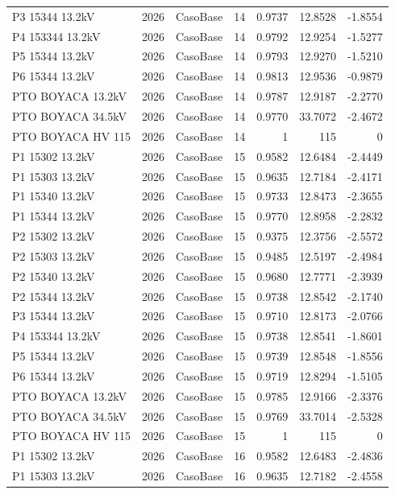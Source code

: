 \documentclass[11pt,a4paper]{article}
\begin{document}
\begin{longtable}{llllrrr}
P3 15344 13.2kV & 2026 & CasoBase & 14 & 0.9737 & 12.8528 & -1.8554 \\
P4 153344 13.2kV & 2026 & CasoBase & 14 & 0.9792 & 12.9254 & -1.5277 \\
P5 15344 13.2kV & 2026 & CasoBase & 14 & 0.9793 & 12.9270 & -1.5210 \\
P6 15344 13.2kV & 2026 & CasoBase & 14 & 0.9813 & 12.9536 & -0.9879 \\
PTO BOYACA 13.2kV & 2026 & CasoBase & 14 & 0.9787 & 12.9187 & -2.2770 \\
PTO BOYACA 34.5kV & 2026 & CasoBase & 14 & 0.9770 & 33.7072 & -2.4672 \\
PTO BOYACA HV 115 & 2026 & CasoBase & 14 & 1 & 115 & 0 \\
P1 15302 13.2kV & 2026 & CasoBase & 15 & 0.9582 & 12.6484 & -2.4449 \\
P1 15303 13.2kV & 2026 & CasoBase & 15 & 0.9635 & 12.7184 & -2.4171 \\
P1 15340 13.2kV & 2026 & CasoBase & 15 & 0.9733 & 12.8473 & -2.3655 \\
P1 15344 13.2kV & 2026 & CasoBase & 15 & 0.9770 & 12.8958 & -2.2832 \\
P2 15302 13.2kV & 2026 & CasoBase & 15 & 0.9375 & 12.3756 & -2.5572 \\
P2 15303 13.2kV & 2026 & CasoBase & 15 & 0.9485 & 12.5197 & -2.4984 \\
P2 15340 13.2kV & 2026 & CasoBase & 15 & 0.9680 & 12.7771 & -2.3939 \\
P2 15344 13.2kV & 2026 & CasoBase & 15 & 0.9738 & 12.8542 & -2.1740 \\
P3 15344 13.2kV & 2026 & CasoBase & 15 & 0.9710 & 12.8173 & -2.0766 \\
P4 153344 13.2kV & 2026 & CasoBase & 15 & 0.9738 & 12.8541 & -1.8601 \\
P5 15344 13.2kV & 2026 & CasoBase & 15 & 0.9739 & 12.8548 & -1.8556 \\
P6 15344 13.2kV & 2026 & CasoBase & 15 & 0.9719 & 12.8294 & -1.5105 \\
PTO BOYACA 13.2kV & 2026 & CasoBase & 15 & 0.9785 & 12.9166 & -2.3376 \\
PTO BOYACA 34.5kV & 2026 & CasoBase & 15 & 0.9769 & 33.7014 & -2.5328 \\
PTO BOYACA HV 115 & 2026 & CasoBase & 15 & 1 & 115 & 0 \\
P1 15302 13.2kV & 2026 & CasoBase & 16 & 0.9582 & 12.6483 & -2.4836 \\
P1 15303 13.2kV & 2026 & CasoBase & 16 & 0.9635 & 12.7182 & -2.4558 \\

\end{longtable}
\end{document}
